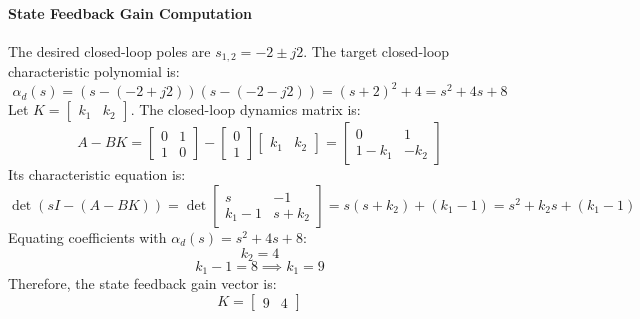 \documentclass[12pt,onecolumn,twoside ]{article}
\begin{document}
	\paragraph{State Feedback Gain Computation}
	The desired closed-loop poles are $s_{1,2} = -2 \pm j2$. The target closed-loop characteristic polynomial is: \[
	\alpha_d(s) = (s - (-2 + j2))(s - (-2 - j2)) = (s + 2)^2 + 4 = s^2 + 4s + 8
	\]
	Let $K = \begin{bmatrix} k_1 & k_2 \end{bmatrix}$. The closed-loop dynamics matrix is: \[
	A - BK = \begin{bmatrix} 0 & 1 \\ 1 & 0 \end{bmatrix} - \begin{bmatrix} 0 \\ 1 \end{bmatrix} \begin{bmatrix} k_1 & k_2 \end{bmatrix} = \begin{bmatrix} 0 & 1 \\ 1 - k_1 & -k_2 \end{bmatrix}
	\]
	Its characteristic equation is: \[
	\det(sI - (A - BK)) = \det \begin{bmatrix} s & -1 \\ k_1 - 1 & s + k_2 \end{bmatrix} = s(s + k_2) + (k_1 - 1) = s^2 + k_2 s + (k_1 - 1)
	\]
	Equating coefficients with $\alpha_d(s) = s^2 + 4s + 8$: \[
	k_2 = 4
	\] \[
	k_1 - 1 = 8 \implies k_1 = 9
	\]
	Therefore, the state feedback gain vector is: \[
	K = \begin{bmatrix} 9 & 4 \end{bmatrix}
	\]
\end{document}
